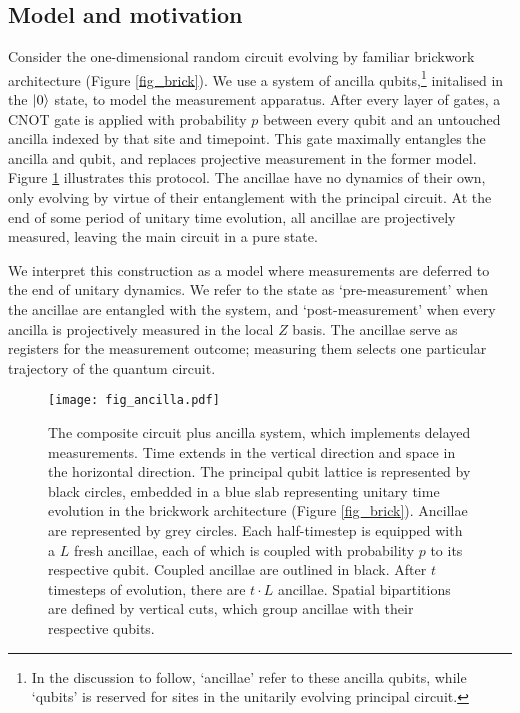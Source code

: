 \documentclass[10pt]{article}
\begin{document}
\subsection{Model and motivation}

Consider the one-dimensional random circuit evolving by familiar brickwork architecture (Figure \ref{fig_brick}). We use a system of ancilla qubits,\footnote{In the discussion to follow, `ancillae' refer to these ancilla qubits, while `qubits' is reserved for sites in the unitarily evolving principal circuit.} initalised in the $\ket{0}$ state, to model the measurement apparatus. After every layer of gates, a CNOT gate is applied with probability $p$ between every qubit and an untouched ancilla indexed by that site and timepoint. This gate maximally entangles the ancilla and qubit, and replaces projective measurement in the former model. Figure \ref{fig_ancilla} illustrates this protocol. The ancillae have no dynamics of their own, only evolving by virtue of their entanglement with the principal circuit. At the end of some period of unitary time evolution, all ancillae are projectively measured, leaving the main circuit in a pure state.

We interpret this construction as a model where measurements are deferred to the end of unitary dynamics. We refer to the state as `pre-measurement' when the ancillae are entangled with the system, and `post-measurement' when every ancilla is projectively measured in the local $Z$ basis. The ancillae serve as registers for the measurement outcome; measuring them selects one particular trajectory of the quantum circuit. 


\begin{figure}
\centering
\texttt{[image: fig\_ancilla.pdf]}
\caption{The composite circuit plus ancilla system, which implements delayed measurements. Time extends in the vertical direction and space in the horizontal direction. The principal qubit lattice is represented by black circles, embedded in a blue slab representing unitary time evolution in the brickwork architecture (Figure \ref{fig_brick}). Ancillae are represented by grey circles. Each half-timestep is equipped with a $L$ fresh ancillae, each of which is coupled with probability $p$ to its respective qubit. Coupled ancillae are outlined in black. After $t$ timesteps of evolution, there are $t\cdot L$ ancillae. Spatial bipartitions are defined by vertical cuts, which group ancillae with their respective qubits.}
\label{fig_ancilla}
\end{figure}
\end{document}
